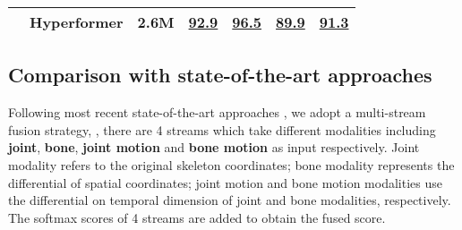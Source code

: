 \documentclass[10pt,twocolumn,letterpaper]{article}
\begin{document}
\begin{table*}[ht]
{\begin{tabular}{@{}l|lccccc@{}}
     &   \textbf{Hyperformer} & 2.6M & \underline{\textbf{92.9}}  & \underline{96.5} & \underline{\textbf{89.9}} & 
\underline{\textbf{91.3}} \\
    \bottomrule
  \end{tabular}
  }
  \label{tab:ntu}
\end{table*}

\begin{table}[h]
  \centering
    \caption{Action classiﬁcation performance on the Northwestern-UCLA dataset.}
  \label{tab:ucla}
\end{table}
\subsection{Comparison with state-of-the-art approaches}
Following most recent state-of-the-art approaches \cite{cheng2020skeleton, ye2020dynamic, chen2021channel, chen2021multi}, we adopt a multi-stream fusion strategy, \ie,
there are 4 streams which take different modalities including \textbf{joint}, \textbf{bone}, \textbf{joint motion} and \textbf{bone motion} as input respectively. Joint modality refers to the original skeleton coordinates; bone modality represents the differential of spatial coordinates; joint motion and bone motion modalities use the differential on
temporal dimension of joint and bone modalities, respectively. The softmax scores
of 4 streams are added to obtain the fused score. 
\end{document}
